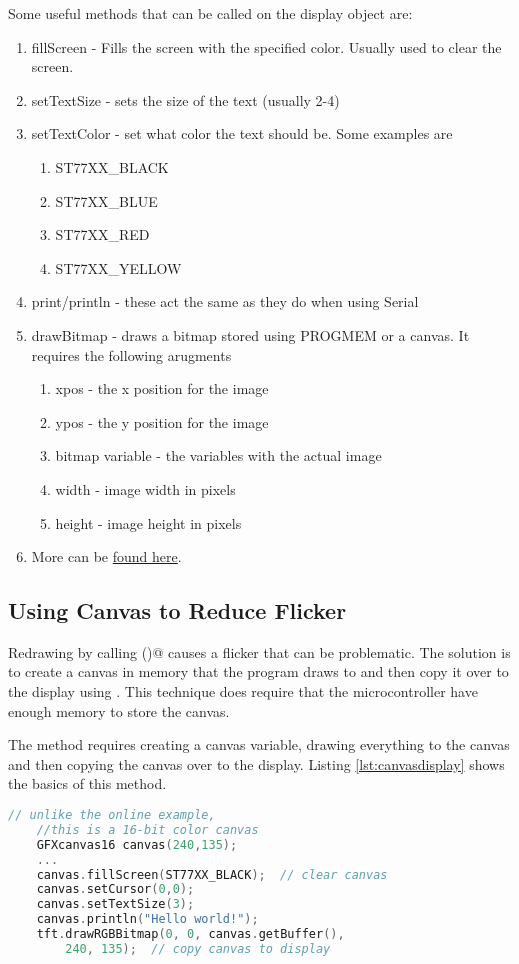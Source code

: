 Some useful methods that can be called on the display object are:
\begin{enumerate}
	\item fillScreen - Fills the screen with the specified color. Usually used to clear the screen.
	\item setTextSize - sets the size of the text (usually 2-4)
	\item setTextColor - set what color the text should be. Some examples are 
	\begin{enumerate}
        \item ST77XX\_BLACK
        \item ST77XX\_BLUE
        \item ST77XX\_RED
        \item ST77XX\_YELLOW
    \end{enumerate}
	\item print/println - these act the same as they do when using Serial
	\item drawBitmap - draws a bitmap stored using PROGMEM or a canvas. It requires the following arugments
	\begin{enumerate}
		\item xpos - the x position for the image
		\item ypos - the y position for the image
		\item bitmap variable - the variables with the actual image
		\item width - image width in pixels
		\item height - image height in pixels 
	\end{enumerate}
	\item More can be \href{https://learn.adafruit.com/adafruit-gfx-graphics-library/graphics-primitives}{found here}.
\end{enumerate}

\subsection{Using Canvas to Reduce Flicker}
Redrawing by calling \lstinline@fillScreen()@ causes a flicker that can be 
problematic. The solution is to create a canvas in memory that the program
draws to and then copy it over to the display using \lstinline@drawBitmap@. 
This technique does require that the microcontroller have enough memory to 
store the canvas.

The method requires creating a canvas variable, drawing everything to the canvas
and then copying the canvas over to the display. Listing \ref{lst:canvasdisplay}
shows the basics of this method.


\begin{lstlisting}[language=C++, caption={Snippets showing how to use a canvas to 
    reduce flicker when updating a display.},label={lst:canvasdisplay}]
    // unlike the online example, 
    //this is a 16-bit color canvas
    GFXcanvas16 canvas(240,135);
    ...
    canvas.fillScreen(ST77XX_BLACK);  // clear canvas
    canvas.setCursor(0,0);
    canvas.setTextSize(3);
    canvas.println("Hello world!");
    tft.drawRGBBitmap(0, 0, canvas.getBuffer(),
        240, 135);  // copy canvas to display
\end{lstlisting}